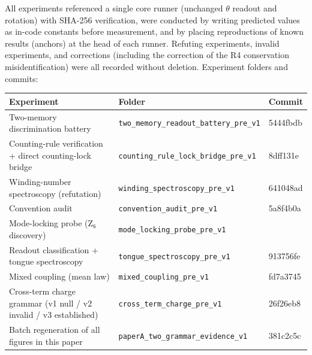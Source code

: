 \documentclass[
  a4paper,
]{article}
\newcounter{none} %
\begin{document}
All experiments referenced a single core runner (unchanged \(\theta\)
readout and rotation) with SHA-256 verification, were conducted by
writing predicted values as in-code constants before measurement, and by
placing reproductions of known results (anchors) at the head of each
runner. Refuting experiments, invalid experiments, and corrections
(including the correction of the R4 conservation misidentification) were
all recorded without deletion. Experiment folders and commits:

{\def\LTcaptype{none} %
\begin{longtable}[]{@{}
  >{\raggedright\arraybackslash}p{}
  >{\raggedright\arraybackslash}p{}
  >{\raggedright\arraybackslash}p{}@{}}
\toprule\noalign{}
\begin{minipage}[b]{\linewidth}\raggedright
Experiment
\end{minipage} & \begin{minipage}[b]{\linewidth}\raggedright
Folder
\end{minipage} & \begin{minipage}[b]{\linewidth}\raggedright
Commit
\end{minipage} \\
\midrule\noalign{}
\endhead
\bottomrule\noalign{}
\endlastfoot
Two-memory discrimination battery &
\texttt{two\_memory\_readout\_battery\_pre\_v1} & 5444fbdb \\
Counting-rule verification + direct counting-lock bridge &
\texttt{counting\_rule\_lock\_bridge\_pre\_v1} & 8dff131e \\
Winding-number spectroscopy (refutation) &
\texttt{winding\_spectroscopy\_pre\_v1} & 641048ad \\
Convention audit & \texttt{convention\_audit\_pre\_v1} & 5a8f4b0a \\
Mode-locking probe (Z₆ discovery) &
\texttt{mode\_locking\_probe\_pre\_v1} & 56453653 \\
Readout classification + tongue spectroscopy &
\texttt{tongue\_spectroscopy\_pre\_v1} & 913756fe \\
Mixed coupling (mean law) & \texttt{mixed\_coupling\_pre\_v1} &
fd7a3745 \\
Cross-term charge grammar (v1 null / v2 invalid / v3 established) &
\texttt{cross\_term\_charge\_pre\_v1} & 26f26eb8 \\
Batch regeneration of all figures in this paper &
\texttt{paperA\_two\_grammar\_evidence\_v1} & 381c2c5c \\

\end{longtable}}
\end{document}
